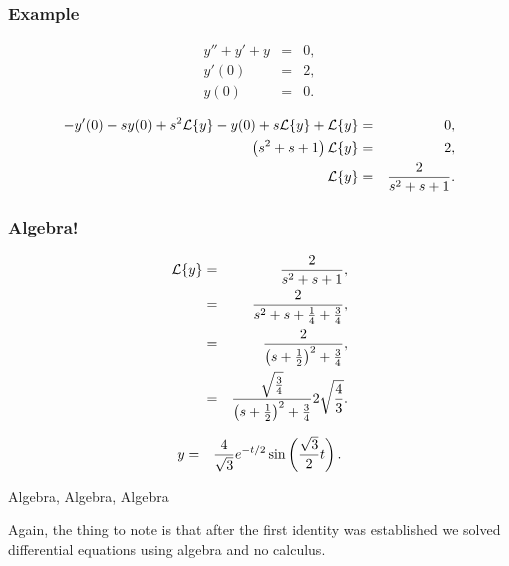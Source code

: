 \begin{frame}
  \frametitle{Example}

  \begin{eqnarray*}
    y''+y'+y & = & 0, \\
    y'(0) & = & 2, \\
    y(0) & = & 0.
  \end{eqnarray*}

  {
    \begin{eqnarray*}
      -y'(0) - sy(0) + s^2 \laplace{y} - y(0) + s \laplace{y} + \laplace{y} & = & 0, \\
      \lp s^2+s+1 \rp \laplace{y} & = & 2, \\
      \laplace{y} & = & \frac{2}{s^2+s+1}.
    \end{eqnarray*}
        
  }

\end{frame}


\begin{frame}
  \frametitle{Algebra!}

  \begin{eqnarray*}
    \laplace{y} & = & \frac{2}{s^2+s+1}, \\
    & = & \frac{2}{s^2+s+\frac{1}{4} + \frac{3}{4}}, \\
    & = & \frac{2}{\lp s + \half \rp^2 + \frac{3}{4}}, \\
    & = & \frac{\sqrt{\frac{3}{4}}}{\lp s + \half \rp^2 + \frac{3}{4}} 2 \sqrt{\frac{4}{3}}.
  \end{eqnarray*}

  {
    \begin{eqnarray*}
      y & = & \frac{4}{\sqrt{3}} e^{-t/2}\sin\left(\frac{\sqrt{3}}{2} t\right).
    \end{eqnarray*}
  }

\end{frame}


\begin{frame}{Algebra, Algebra, Algebra }

  \vfill

  Again, the thing to note is that after the first identity was
  established we solved differential equations using algebra and no
  calculus.

  \vfill
  
\end{frame}



